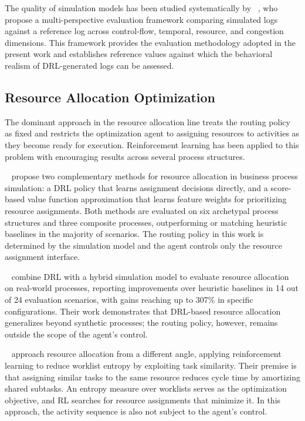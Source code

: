 \documentclass[journal,onecolumn]{IEEEtran}
\begin{document}
The quality of simulation models has been studied systematically by
\citeauthor{framework_for_measuring_the_quality_of_business_process_simulation_models}~\cite{framework_for_measuring_the_quality_of_business_process_simulation_models},
who propose a multi-perspective evaluation framework comparing
simulated logs against a reference log across control-flow, temporal,
resource, and congestion dimensions. This framework provides the
evaluation methodology adopted in the present work and establishes
reference values against which the behavioral realism of DRL-generated
logs can be assessed.

\subsection{Resource Allocation Optimization}
\label{subsec:soa_resource_allocation}

The dominant approach in the resource allocation line treats the
routing policy as fixed and restricts the optimization agent to
assigning resources to activities as they become ready for execution.
Reinforcement learning has been applied to this problem with
encouraging results across several process structures.

\citeauthor{Learning_policies_drl}~\cite{Learning_policies_drl}
propose two complementary methods for resource allocation in business
process simulation: a DRL policy that learns assignment decisions
directly, and a score-based value function approximation that learns
feature weights for prioritizing resource assignments. Both methods
are evaluated on six archetypal process structures and three composite
processes, outperforming or matching heuristic baselines in the
majority of scenarios. The routing policy in this work is determined
by the simulation model and the agent controls only the resource
assignment interface.

\citeauthor{Optimizing_Resource_Allocation_Policies}~\cite{Optimizing_Resource_Allocation_Policies}
combine DRL with a hybrid simulation model to evaluate resource
allocation on real-world processes, reporting improvements over
heuristic baselines in 14 out of 24 evaluation scenarios, with gains
reaching up to 307\% in specific configurations. Their work
demonstrates that DRL-based resource allocation generalizes beyond
synthetic processes; the routing policy, however, remains outside
the scope of the agent's control.

\citeauthor{Resource_allocation_using_task_similarity}~\cite{Resource_allocation_using_task_similarity}
approach resource allocation from a different angle, applying
reinforcement learning to reduce worklist entropy by exploiting
task similarity. Their premise is that assigning similar tasks to
the same resource reduces cycle time by amortizing shared subtasks.
An entropy measure over worklists serves as the optimization
objective, and RL searches for resource assignments that minimize
it. In this approach, the activity sequence is also not subject to
the agent's control.
\end{document}
